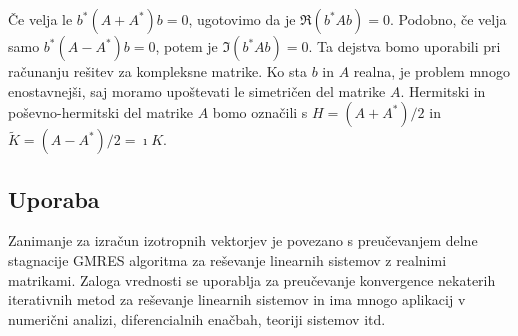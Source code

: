 \documentclass[12pt,a4paper]{amsart}
\theoremstyle{definition}
\theoremstyle{plain}
\begin{document}
Če velja le $b^\ast (A+A^\ast)b=0$, ugotovimo da je $\Re(b^\ast Ab)=0$. Podobno, če velja samo $b^\ast(A-A^\ast)b=0$, potem je $\Im(b^\ast Ab)=0$. Ta dejstva bomo uporabili pri računanju rešitev za kompleksne matrike. 
Ko sta $b$ in $A$ realna, je problem mnogo enostavnejši, saj moramo upoštevati le simetričen del matrike $A$.
Hermitski in poševno-hermitski del matrike $A$ bomo označili s $H=(A+A^\ast)/2$ in $\tilde{K}=(A-A^\ast)/2=\imath K$.

\subsection{Uporaba}
Zanimanje za izračun izotropnih vektorjev je povezano s pre\-u\-če\-va\-njem delne stagnacije GMRES algoritma za reševanje linearnih sistemov z realnimi matrikami. Zaloga vrednosti se uporablja za preučevanje konvergence nekaterih iterativnih metod za reševanje linearnih sistemov in ima mnogo aplikacij v numerični analizi, diferencialnih enačbah, teoriji sistemov itd.

\end{document}
